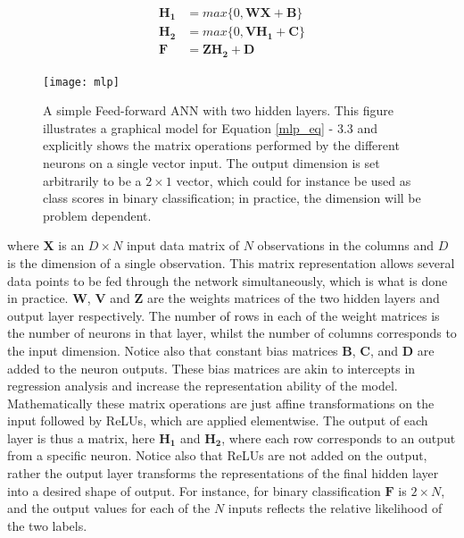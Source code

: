 \documentclass[12pt]{report}
\begin{document}
\begin{align} \label{mlp_eq}
  \mathbf{H_1} &= max\{0, \mathbf{W}\mathbf{X} + \mathbf{B}\} \\
  \mathbf{H_2} &= max\{0, \mathbf{V}\mathbf{H_1} + \mathbf{C}\} \\ 
  \mathbf{F} &= \mathbf{Z} \mathbf{H_{2}} + \mathbf{D} 
\end{align}

\begin{figure}
  \centering
	\texttt{[image: mlp]}
	\caption{A simple Feed-forward ANN with two hidden layers. This figure illustrates a graphical model for Equation \ref{mlp_eq} - 3.3 and explicitly shows the matrix operations performed by the different neurons on a single vector input. The output dimension is set arbitrarily to be a $2\times1$ vector, which could for instance be used as class scores in binary classification; in practice, the dimension will be problem dependent.}
	\label{fig:mlp}
\end{figure}

where $\mathbf{X}$ is an $D\times N$ input data matrix of $N$ observations in the columns and $D$ is the dimension of a single observation. This matrix representation allows several data points to be fed through the network simultaneously, which is what is done in practice. $\mathbf{W}$, $\mathbf{V}$ and $\mathbf{Z}$ are the weights matrices of the two hidden layers and output layer respectively. The number of rows in each of the weight matrices is the number of neurons in that layer, whilst the number of columns corresponds to the input dimension. Notice also that constant bias matrices $\mathbf{B}$, $\mathbf{C}$, and $\mathbf{D}$ are added to the neuron outputs. These bias matrices are akin to intercepts in regression analysis and increase the representation ability of the model. Mathematically these matrix operations are just affine transformations on the input followed by ReLUs, which are applied elementwise. The output of each layer is thus a matrix, here $\mathbf{H_1}$ and $\mathbf{H_2}$, where each row corresponds to an output from a specific neuron. Notice also that ReLUs are not added on the output, rather the output layer transforms the representations of the final hidden layer into a desired shape of output. For instance, for binary classification $\mathbf{F}$ is $2 \times N$, and the output values for each of the $N$ inputs reflects the relative likelihood of the two labels.
\end{document}
